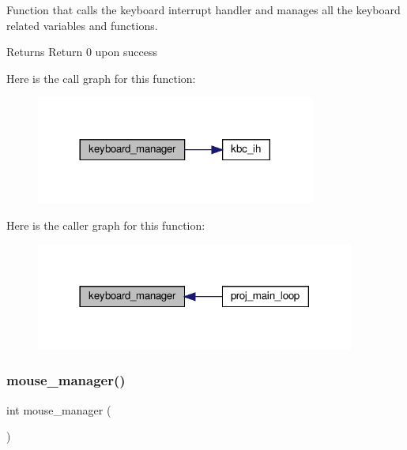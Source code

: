 Function that calls the keyboard interrupt handler and manages all the keyboard related variables and functions. 

\begin{DoxyReturn}{Returns}
Return 0 upon success 
\end{DoxyReturn}
Here is the call graph for this function\+:
\nopagebreak
\begin{figure}[H]
\begin{center}
\leavevmode
\includegraphics[width=260pt]{group__main__functions_gaaf064e0d3192ae8797d78dcb08bc838e_cgraph}
\end{center}
\end{figure}
Here is the caller graph for this function\+:\nopagebreak
\begin{figure}[H]
\begin{center}
\leavevmode
\includegraphics[width=297pt]{group__main__functions_gaaf064e0d3192ae8797d78dcb08bc838e_icgraph}
\end{center}
\end{figure}
\mbox{\label{group__main__functions_ga8c9f11a032076f800d5d8e3faea17c9a}} 
\subsubsection{\texorpdfstring{mouse\+\_\+manager()}{mouse\_manager()}}
{\footnotesize\ttfamily int mouse\+\_\+manager (\begin{DoxyParamCaption}{ }\end{DoxyParamCaption})}



